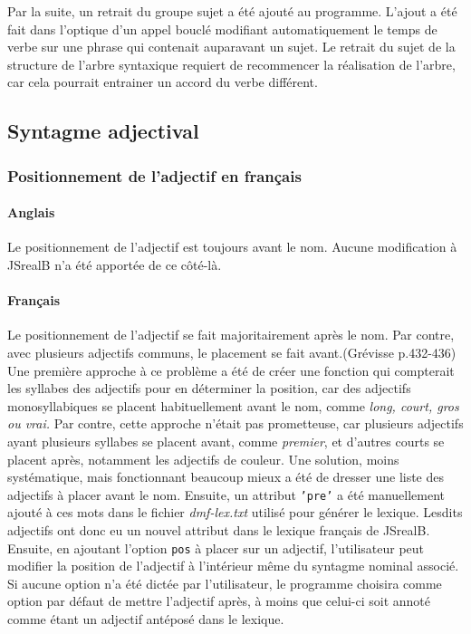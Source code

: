 \documentclass[11pt]{article} %
\newcommand{\system}[1]{\textsf{#1}}
\newcommand{\JSB}{\system{JSrealB}}
\begin{document}
Par la suite, un retrait du groupe sujet a été ajouté au programme.
L'ajout a été fait dans l'optique d'un appel bouclé modifiant automatiquement
le temps de verbe
sur une phrase qui contenait auparavant un sujet. Le retrait du sujet
de la structure de l'arbre syntaxique requiert de recommencer la réalisation
de l'arbre, car cela pourrait entrainer un accord du verbe différent.


\subsection{Syntagme adjectival}
\subsubsection{Positionnement de l'adjectif en français}
\paragraph{Anglais} Le positionnement de l'adjectif est toujours avant le nom. 
Aucune modification à \JSB{} n'a été apportée de ce côté-là.
\paragraph{Français}
Le positionnement de l'adjectif se fait majoritairement
après le nom. Par contre, avec plusieurs adjectifs communs, le placement
se fait avant.(Grévisse p.432-436)\cite{gramGrevisse} Une première approche à ce problème a été de créer
une fonction qui compterait les syllabes des adjectifs pour en déterminer
la position, car des adjectifs monosyllabiques se placent habituellement
avant le nom, comme \emph{long, court, gros ou vrai.} Par contre,
cette approche n'était pas prometteuse, car plusieurs adjectifs ayant
plusieurs syllabes se placent avant, comme \emph{premier}, et d'autres
courts se placent après, notamment les adjectifs de couleur. Une solution,
moins systématique, mais fonctionnant beaucoup mieux a été de dresser
une liste des adjectifs à placer avant le nom. Ensuite, un attribut
\texttt{'pre'} a été manuellement ajouté à ces mots dans le fichier
\emph{dmf-lex.txt }utilisé pour générer le lexique. Lesdits adjectifs
ont donc eu un nouvel attribut dans le lexique français de \JSB{}.
Ensuite, en ajoutant l'option \texttt{pos} à placer sur un adjectif,
l'utilisateur peut modifier la position de l'adjectif à l'intérieur
même du syntagme nominal associé. Si aucune option n'a été dictée
par l'utilisateur, le programme choisira comme option par défaut de
mettre l'adjectif après, à moins que celui-ci soit annoté comme étant
un adjectif antéposé dans le lexique. 
\end{document}
